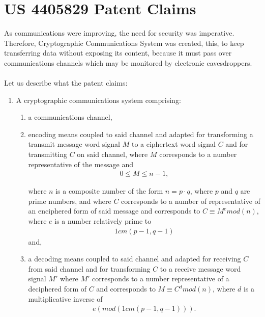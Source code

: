 \documentclass[12pt, a4paper]{article}
\begin{document}
\section{US 4405829 Patent Claims}\label{Claims}
As communications were improving, the need for security was imperative. Therefore, Cryptographic Communications System was created, this, to keep transferring data without exposing its content, because it must pass over communications channels which may be monitored by electronic eavesdroppers.\\\\
\indent Let us describe what the patent claims:
\begin{enumerate}
	\setcounter{enumi}{0}
\item
A cryptographic communications system comprising:
	\begin{enumerate}
		\item
		a communications channel,
		\item
		encoding means coupled to said channel and adapted for transforming a transmit message word signal $M$ to a ciphertext word signal $C$ and for transmitting $C$ on said channel, where $M$ corresponds to a number representative of the message and
		\begin{gather*}
			0 \leq M \leq n-1,
		\end{gather*}		
		
		where $n$ is a composite number of the form $n = p \cdot q$, where $p$ and $q$ are prime numbers, and where $C$ corresponds to a number of representative of an enciphered form of said message and corresponds to $C \equiv M^e mod (n)$, where $e$ is a number relatively prime to
		\begin{gather*}
			1 cm(p-1, q-1)
		\end{gather*}	
		and,
		
		\item
		a decoding means coupled to said channel and adapted for receiving $C$ from said channel and for transforming $C$ to a receive message word signal $M'$ where $M'$ corresponds to a number representative of a deciphered form of $C$ and corresponds to $M\equiv C^d mod(n)$, where $d$ is a multiplicative inverse of
		\begin{gather*}
			e(mod(1cm(p-1, q-1))).
		\end{gather*}		
	\end{enumerate}


\end{enumerate}
\end{document}
